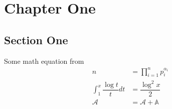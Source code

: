\chapter{Chapter One}
\section{Section One}
Some math equation from \cites{meissel_1870,meissel_1871}
	\begin{align*}
		n
			& = \prod_{i=1}^{n}p_{i}^{\alpha_{i}}\\
		\int_{1}^{x}\dfrac{\log{t}}{t}dt
			& = \dfrac{\log^{2}x}{2}\\
		\mathscr{A}
			& = \mathcal{A}+\mathbb{A}
	\end{align*}
\lipsum